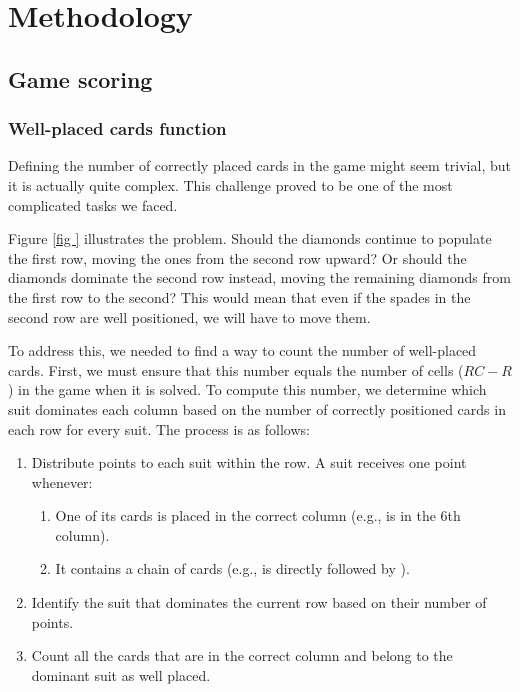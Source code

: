 \chapter{Methodology}
\section{Game scoring}
\subsection{Well-placed cards function}
Defining the number of correctly placed cards in the game might seem trivial, but it is actually quite complex. This challenge proved to be one of the most complicated tasks we faced.

Figure \ref{fig
} illustrates the problem. Should the diamonds continue to populate the first row, moving the ones from the second row upward? Or should the diamonds dominate the second row instead, moving the remaining diamonds from the first row to the second? This would mean that even if the spades in the second row are well positioned, we will have to move them.

To address this, we needed to find a way to count the number of well-placed cards. First, we must ensure that this number equals the number of cells ($RC - R$) in the game when it is solved. To compute this number, we determine which suit dominates each column based on the number of correctly positioned cards in each row for every suit. The process is as follows:

\begin{enumerate}
    \item Distribute points to each suit within the row. A suit receives one point whenever:
    \begin{enumerate}
        \item One of its cards is placed in the correct column (e.g.,  is in the 6th column).
        \item It contains a chain of cards (e.g.,  is directly followed by ).
    \end{enumerate}
    \item Identify the suit that dominates the current row based on their number of points.
    \item Count all the cards that are in the correct column and belong to the dominant suit as well placed.
\end{enumerate}

